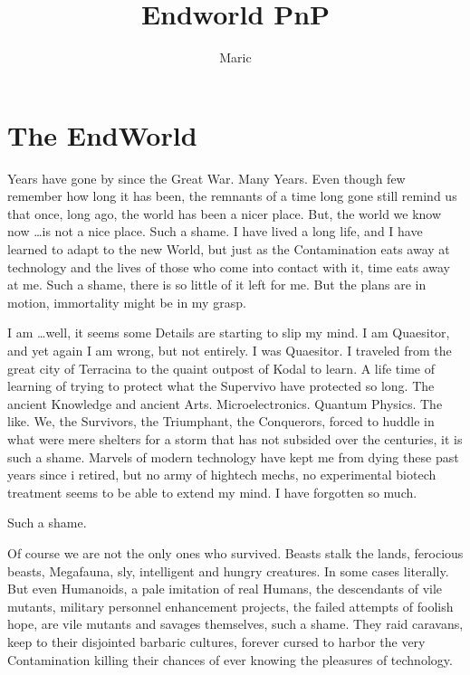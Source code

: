 \documentclass{book}
\title{Endworld PnP}
\author{Maric}
\date{}
\begin{document}
    \maketitle
    \tableofcontents
    \chapter{The EndWorld}\label{ch:theendworld}

    Years have gone by since the Great War.
    Many Years.
    Even though few remember how long it has been, the remnants of a time long gone still remind us that once,
    long ago, the world has been a nicer place.
    But, the world we know now \ldots is not a nice place.
    Such a shame.
    I have lived a long life, and I have learned to adapt to the new World,
    but just as the Contamination eats away at technology and the lives of those who come into contact with it, time
    eats away at me.
    Such a shame, there is so little of it left for me.
    But the plans are in motion, immortality might be in my grasp.\par
    I am \ldots well, it seems some Details are starting to slip my mind.
    I am Quaesitor, and yet again I am wrong, but not entirely.
    I was Quaesitor.
    I traveled from the great city of Terracina to the quaint outpost of Kodal to learn.
    A life time of learning of trying to protect what the Supervivo have protected so long.
    The ancient Knowledge and ancient Arts.
    Microelectronics.
    Quantum Physics.
    The like.
    We, the Survivors, the Triumphant, the Conquerors,
    forced to huddle in what were mere shelters for a storm that has not subsided over the centuries,
    it is such a shame.
    Marvels of modern technology have kept me from dying these past years since i retired,
    but no army of hightech mechs, no experimental biotech treatment seems to be able to extend my mind.
    I have forgotten so much.
    \par Such a shame.\par
    Of course we are not the only ones who survived.
    Beasts stalk the lands, ferocious beasts, Megafauna, sly, intelligent and hungry creatures.
    In some cases literally.
    But even Humanoids, a pale imitation of real Humans, the descendants of vile mutants,
    military personnel enhancement projects, the failed attempts of foolish hope,
    are vile mutants and savages themselves, such a shame.
    They raid caravans, keep to their disjointed barbaric cultures,
    forever cursed to harbor the very Contamination killing their chances of ever knowing the pleasures of technology.
\end{document}
